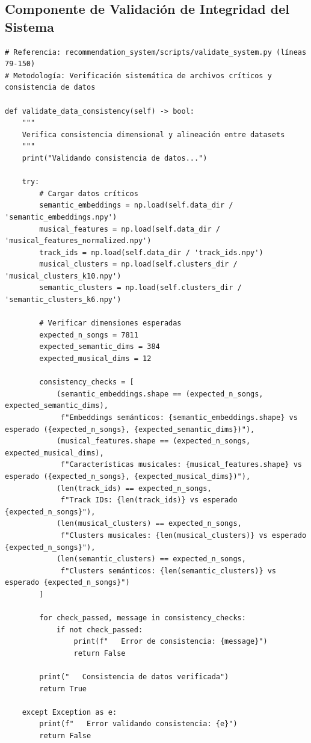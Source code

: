 \documentclass[12pt,a4paper]{article}
\begin{document}
\subsection{Componente de Validación de Integridad del Sistema}

\begin{lstlisting}[caption={Verificación Sistemática de Consistencia de Datos}]
# Referencia: recommendation_system/scripts/validate_system.py (líneas 79-150)
# Metodología: Verificación sistemática de archivos críticos y consistencia de datos

def validate_data_consistency(self) -> bool:
    """
    Verifica consistencia dimensional y alineación entre datasets
    """
    print("Validando consistencia de datos...")

    try:
        # Cargar datos críticos
        semantic_embeddings = np.load(self.data_dir / 'semantic_embeddings.npy')
        musical_features = np.load(self.data_dir / 'musical_features_normalized.npy')
        track_ids = np.load(self.data_dir / 'track_ids.npy')
        musical_clusters = np.load(self.clusters_dir / 'musical_clusters_k10.npy')
        semantic_clusters = np.load(self.clusters_dir / 'semantic_clusters_k6.npy')

        # Verificar dimensiones esperadas
        expected_n_songs = 7811
        expected_semantic_dims = 384
        expected_musical_dims = 12

        consistency_checks = [
            (semantic_embeddings.shape == (expected_n_songs, expected_semantic_dims),
             f"Embeddings semánticos: {semantic_embeddings.shape} vs esperado ({expected_n_songs}, {expected_semantic_dims})"),
            (musical_features.shape == (expected_n_songs, expected_musical_dims),
             f"Características musicales: {musical_features.shape} vs esperado ({expected_n_songs}, {expected_musical_dims})"),
            (len(track_ids) == expected_n_songs,
             f"Track IDs: {len(track_ids)} vs esperado {expected_n_songs}"),
            (len(musical_clusters) == expected_n_songs,
             f"Clusters musicales: {len(musical_clusters)} vs esperado {expected_n_songs}"),
            (len(semantic_clusters) == expected_n_songs,
             f"Clusters semánticos: {len(semantic_clusters)} vs esperado {expected_n_songs}")
        ]

        for check_passed, message in consistency_checks:
            if not check_passed:
                print(f"   Error de consistencia: {message}")
                return False

        print("   Consistencia de datos verificada")
        return True

    except Exception as e:
        print(f"   Error validando consistencia: {e}")
        return False
\end{lstlisting}
\end{document}
